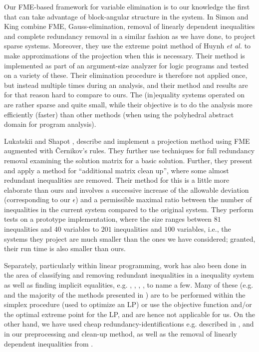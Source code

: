 Our FME-based framework for variable elimination is to our knowledge the first that can take advantage of block-angular structure in the system. In \cite{simon05} Simon and King combine FME, Gauss-elimination, removal of linearly dependent inequalities and complete redundancy removal in a similar fashion as we have done, to project sparse systems. Moreover, they use the extreme point method of Huynh \textit{et al.} \cite{huynh92} to make approximations of the projection when this is necessary. Their method is implemented as part of an argument-size analyzer for logic programs and tested on a variety of these. Their elimination procedure is therefore not applied once, but instead multiple times during an analysis, and their method and results are for that reason hard to compare to ours. The (in)equality systems operated on are rather sparse and quite small, while their objective is to do the analysis more efficiently (faster) than other methods (when using the polyhedral abstract domain for program analysis). 

Lukatskii and Shapot \cite{lukatskii08}, \cite{shapot12} describe and implement a projection method using FME augmented with \v{C}ernikov's rules. They further use techniques for full redundancy removal examining the solution matrix for a basic solution. Further, they present and apply a method for ``additional matrix clean up'', where some almost redundant inequalities are removed. Their method for this is a little more elaborate than ours and involves a successive increase of the allowable deviation (corresponding to our $\epsilon$) and a permissible maximal ratio between the number of inequalities in the current system compared to the original system. They perform tests on a prototype implementation, where the size ranges between $81$ inequalities and $40$ variables to $201$ inequalities and $100$ variables, i.e., the systems they project are much smaller than the ones we have considered; granted, their run time is also smaller than ours. 

Separately, particularly within linear programming, work has also been done in the area of classifying and removing redundant inequalities in a inequality system as well as finding implicit equalities, e.g. \cite{telgen83}, \cite{lassez93}, \cite{karwan83}, \cite{andersen95}, \cite{mattheiss73} to name a few. 
Many of these (e.g. \cite{telgen83} and the {majority} of the methods presented in \cite{karwan83}) are to be performed within the simplex procedure (used to optimize an LP) or use the objective function and/or the optimal extreme point for the LP, and are hence not applicable for us. On the other hand, we have used cheap redundancy-identifications e.g. described in \cite{andersen95}, \cite{brearley75} and \cite{maros} in our preprocessing and clean-up method, as well as the removal of linearly dependent inequalities from \cite{lassez93}.

